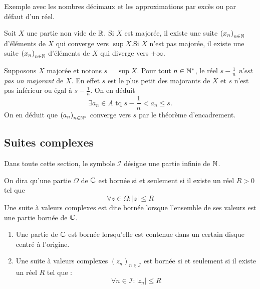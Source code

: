 Exemple avec les nombres décimaux et les approximations par excès ou par défaut d'un réel.
\begin{propn}
  Soit $X$ une partie non vide de $\mathbb{R}$. Si $X$ est majorée, il existe une suite $\left( x_n\right)_{n\in \mathbb{N}}$ d'éléments de $X$ qui converge vers $\sup X$.\newline Si $X$ n'est pas majorée, il existe une suite $\left( x_n\right)_{n\in \mathbb{N}}$ d'éléments de $X$ qui diverge vers $+\infty$.
\end{propn}
\begin{demo}
Supposons $X$ majorée et notons $s = \sup X$.\newline
Pour tout $n\in \mathbb{N}^*$, le réel $s-\frac{1}{n}$ \emph{n'est pas un majorant} de $X$. En effet $s$ est le plus petit des majorants de $X$ et $s$ n'est pas inférieur ou égal à $s-\frac{1}{n}$. On en déduit 
\[
 \exists a_n \in A \text{ tq } s - \frac{1}{n} < a_n \leq s. 
\]
On en déduit que $\left( a_n \right)_{n \in \mathbb{N}^*}$ converge vers $s$ par le théorème d'encadrement.
\end{demo}

\subsection{Suites complexes}
Dans toute cette section, le symbole $\mathcal I$ désigne une partie infinie de $\mathbb{N}$.
\begin{defi}
 On dira qu'une partie $\Omega$ de $\mathbb{C}$ est bornée si et seulement si il existe un réel $R>0$ tel que 
\begin{displaymath}
 \forall z\in \Omega : |z|\leq R
\end{displaymath}
Une suite à valeurs complexes est dite bornée lorsque l'ensemble de ses valeurs est une partie bornée de $\mathbb{C}$.
\end{defi}
\begin{rems}
\begin{enumerate}
 \item Une partie de $\mathbb{C}$ est bornée lorsqu'elle est contenue dans un certain disque centré à l'origine.
\item Une suite à valeurs complexes $(z_n)_{n\in \mathcal I}$ est bornée si et seulement si il existe un réel $R$ tel que :
\begin{displaymath}
 \forall n\in \mathcal I : |z_n|\leq R
\end{displaymath}
\end{enumerate}
\end{rems}

